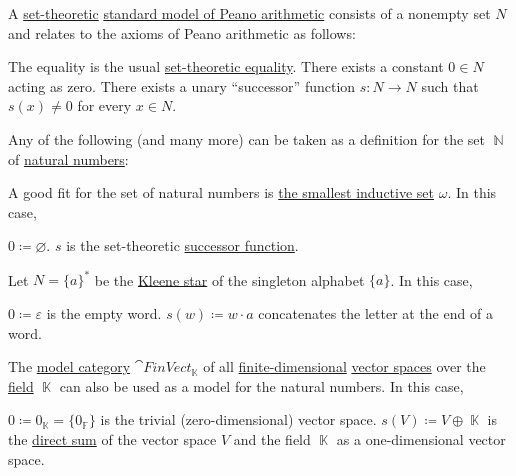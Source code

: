\begin{example}\label{ex:natural_numbers_models}
  A \hyperref[sec:set_theory]{set-theoretic} \hyperref[def:peano_arithmetic]{standard model of Peano arithmetic} consists of a nonempty set \( N \) and relates to the axioms of Peano arithmetic as follows:
  \begin{reflist}
     The equality is the usual \hyperref[def:set_zfc]{set-theoretic equality}.
     There exists a constant \( 0 \in N \) acting as zero.
     There exists a unary \enquote{successor} function \( s: N \to N \) such that \( s(x) \neq 0 \) for every \( x \in N \).
  \end{reflist}

  Any of the following (and many more) can be taken as a definition for the set \( \BbbN \) of \hyperref[def:natural_numbers]{natural numbers}:
  \begin{defenum}
     A good fit for the set of natural numbers is \hyperref[def:smallest_inductive_set]{the smallest inductive set} \( \omega \). In this case,
    \begin{reflist}
       \( 0 \coloneqq \varnothing \).
       \( s \) is the set-theoretic \hyperref[def:successor_operator]{successor function}.
    \end{reflist}

     Let \( N = \{ a \}^{*} \) be the \hyperref[def:language/kleene_star]{Kleene star} of the singleton alphabet \( \{ a \} \). In this case,
    \begin{reflist}
       \( 0 \coloneqq \varepsilon \) is the empty word.
       \( s(w) \coloneqq w \cdot a \) concatenates the letter at the end of a word.
    \end{reflist}

     The \hyperref[def:first_order_model_category]{model category} \( \cat{FinVect}_{\BbbK} \) of all \hyperref[def:vector_space_dimension]{finite-dimensional} \hyperref[def:vector_space]{vector spaces} over the \hyperref[def:field]{field} \( \BbbK \) can also be used as a model for the natural numbers. In this case,
    \begin{reflist}
       \( 0 \coloneqq 0_{\BbbK} = \{ 0_{\BbbF} \} \) is the trivial (zero-dimensional) vector space.
       \( s(V) \coloneqq V \oplus \BbbK \) is the \hyperref[def:left_module_direct_product]{direct sum} of the vector space \( V \) and the field \( \BbbK \) as a one-dimensional vector space.
    \end{reflist}
  \end{defenum}
\end{example}


